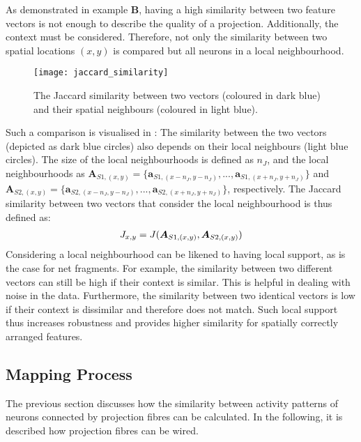 As demonstrated in  example $\boldsymbol{B}$, having a high similarity between two feature vectors is not enough to describe the quality of a projection.
Additionally, the context must be considered.
Therefore, not only the similarity between two spatial locations $(x,y)$ is compared but all neurons in a local neighbourhood.
\begin{figure}[h]
    \centering
    \texttt{[image: jaccard\_similarity]}
    \caption[Similarity between two vectors and their spatial neighbours]{The Jaccard similarity between two vectors (coloured in dark blue) and their spatial neighbours (coloured in light blue).}
\end{figure}
Such a comparison is visualised in :
The similarity between the two vectors (depicted as dark blue circles) also depends on their local neighbours (light blue circles).
The size of the local neighbourhoods is defined as $n_J$, and the local neighbourhoods as $\boldsymbol{A}_{S1,(x,y)} = \{ \boldsymbol{a}_{S1,(x-n_J,y-n_J)}, ..., \boldsymbol{a}_{S1,(x+n_J,y+n_J)}\}$ and $\boldsymbol{A}_{S2,(x,y)} = \{ \boldsymbol{a}_{S2,(x-n_J,y-n_J)}, ..., \boldsymbol{a}_{S2,(x+n_J,y+n_J)}\}$, respectively.
The Jaccard similarity between two vectors that consider the local neighbourhood is thus defined as:
%
\begin{align}\eqlbl{jaccard2}
	J_{x,y} = J(\boldsymbol{A}_{S1,(x,y)}, \boldsymbol{A}_{S2,(x,y)})
\end{align}
%
Considering a local neighbourhood can be likened to having local support, as is the case for net fragments. For example, the similarity between two different vectors can still be high if their context is similar. This is helpful in dealing with noise in the data.
Furthermore, the similarity between two identical vectors is low if their context is dissimilar and therefore does not match.
Such local support thus increases robustness and provides higher similarity for spatially correctly arranged features.


\subsection{Mapping Process}
The previous section discusses how the similarity between activity patterns of neurons connected by projection fibres can be calculated.
In the following, it is described how projection fibres can be wired.

